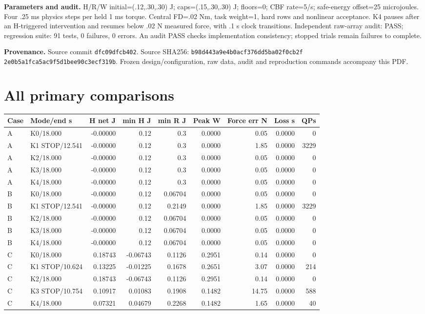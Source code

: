 \documentclass[10pt,letterpaper]{article}
\begin{document}
\textbf{Parameters and audit.} H/R/W initial=(.12,.30,.30) J; caps=(.15,.30,.30) J; floors=0; CBF rate=5/s; safe-energy offset=25 microjoules. Four .25 ms physics steps per held 1 ms torque. Central FD=.02 Nm, task weight=1, hard rows and nonlinear acceptance. K4 pauses after an H-triggered intervention and resumes below .02 N measured force, with .1 s clock transitions.
Independent raw-array audit: PASS; regression suite: 91 tests, 0 failures, 0 errors. An audit PASS checks implementation consistency; stopped trials remain failures to complete.\par
\textbf{Provenance.} Source commit \texttt{dfc09dfcb402}. Source SHA256: \texttt{b98d443a9e4b0acf376dd5ba02f0cb2f}\\\texttt{2e0b5a1fca5ac9f5d1bee90c3ecf319b}. Frozen design/configuration, raw data, audit and reproduction commands accompany this PDF.
\clearpage\section*{All primary comparisons}
\begingroup\small\setlength{\tabcolsep}{3pt}\begin{center}\begin{tabular}{llrrrrrrr}\toprule Case & Mode/end s & H net J & min H J & min R J & Peak W & Force err N & Loss s & QPs\\\midrule
A & K0/18.000 & -0.00000 & 0.12 & 0.3 & 0.0000 & 0.05 & 0.0000 & 0 \\
A & K1 STOP/12.541 & -0.00000 & 0.12 & 0.3 & 0.0000 & 1.85 & 0.0000 & 3229 \\
A & K2/18.000 & -0.00000 & 0.12 & 0.3 & 0.0000 & 0.05 & 0.0000 & 0 \\
A & K3/18.000 & -0.00000 & 0.12 & 0.3 & 0.0000 & 0.05 & 0.0000 & 0 \\
A & K4/18.000 & -0.00000 & 0.12 & 0.3 & 0.0000 & 0.05 & 0.0000 & 0 \\
B & K0/18.000 & -0.00000 & 0.12 & 0.06704 & 0.0000 & 0.05 & 0.0000 & 0 \\
B & K1 STOP/12.541 & -0.00000 & 0.12 & 0.2149 & 0.0000 & 1.85 & 0.0000 & 3229 \\
B & K2/18.000 & -0.00000 & 0.12 & 0.06704 & 0.0000 & 0.05 & 0.0000 & 0 \\
B & K3/18.000 & -0.00000 & 0.12 & 0.06704 & 0.0000 & 0.05 & 0.0000 & 0 \\
B & K4/18.000 & -0.00000 & 0.12 & 0.06704 & 0.0000 & 0.05 & 0.0000 & 0 \\
C & K0/18.000 & 0.18743 & -0.06743 & 0.1126 & 0.2951 & 0.14 & 0.0000 & 0 \\
C & K1 STOP/10.624 & 0.13225 & -0.01225 & 0.1678 & 0.2651 & 3.07 & 0.0000 & 214 \\
C & K2/18.000 & 0.18743 & -0.06743 & 0.1126 & 0.2951 & 0.14 & 0.0000 & 0 \\
C & K3 STOP/10.754 & 0.10917 & 0.01083 & 0.1908 & 0.1482 & 14.75 & 0.0000 & 588 \\
C & K4/18.000 & 0.07321 & 0.04679 & 0.2268 & 0.1482 & 1.65 & 0.0000 & 40 \\
\bottomrule\end{tabular}\end{center}\endgroup\par
\end{document}
